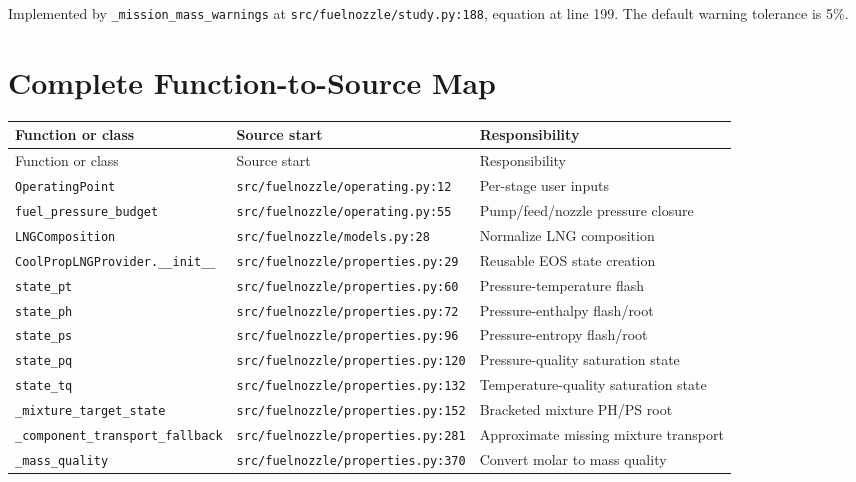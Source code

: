 \documentclass[11pt]{article}
\newcommand{\code}[1]{\nolinkurl{#1}}
\newcommand{\srcline}[2]{\nolinkurl{#1:#2}}
\begin{document}
Implemented by \code{_mission_mass_warnings} at
\srcline{src/fuelnozzle/study.py}{188}, equation at line 199. The default warning
tolerance is 5\%.

\section{Complete Function-to-Source Map}

\footnotesize
\begin{longtable}{>{\raggedright\arraybackslash}p{}
                  >{\raggedright\arraybackslash}p{}
                  >{\raggedright\arraybackslash}p{}}
\toprule
Function or class & Source start & Responsibility \\
\midrule
\endfirsthead
\toprule
Function or class & Source start & Responsibility \\
\midrule
\endhead
\code{OperatingPoint} & \srcline{src/fuelnozzle/operating.py}{12} & Per-stage user inputs \\
\code{fuel_pressure_budget} & \srcline{src/fuelnozzle/operating.py}{55} & Pump/feed/nozzle pressure closure \\
\code{LNGComposition} & \srcline{src/fuelnozzle/models.py}{28} & Normalize LNG composition \\
\code{CoolPropLNGProvider.__init__} & \srcline{src/fuelnozzle/properties.py}{29} & Reusable EOS state creation \\
\code{state_pt} & \srcline{src/fuelnozzle/properties.py}{60} & Pressure-temperature flash \\
\code{state_ph} & \srcline{src/fuelnozzle/properties.py}{72} & Pressure-enthalpy flash/root \\
\code{state_ps} & \srcline{src/fuelnozzle/properties.py}{96} & Pressure-entropy flash/root \\
\code{state_pq} & \srcline{src/fuelnozzle/properties.py}{120} & Pressure-quality saturation state \\
\code{state_tq} & \srcline{src/fuelnozzle/properties.py}{132} & Temperature-quality saturation state \\
\code{_mixture_target_state} & \srcline{src/fuelnozzle/properties.py}{152} & Bracketed mixture PH/PS root \\
\code{_component_transport_fallback} & \srcline{src/fuelnozzle/properties.py}{281} & Approximate missing mixture transport \\
\code{_mass_quality} & \srcline{src/fuelnozzle/properties.py}{370} & Convert molar to mass quality \\

\end{longtable}
\end{document}
